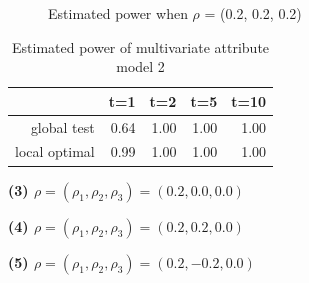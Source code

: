 \documentclass[12pt]{report}
\begin{document}
\begin{figure}[H]
\caption{Estimated power when $\rho$ = (0.2, 0.2, 0.2)}
\label{fig:multi2}    
\end{figure} 


\begin{table}[ht]
\centering
\begin{tabular}{rrrrr}
  \hline
 & t=1 & t=2 & t=5 & t=10 \\ 
  \hline
global test & 0.64 & 1.00 & 1.00 & 1.00 \\ 
  local optimal & 0.99 & 1.00 & 1.00 & 1.00 \\ 
   \hline
\end{tabular}
\caption{Estimated power of multivariate attribute model 2}
\end{table}

\textbf{(3) $\rho = (\rho_{1}, \rho_{2}, \rho_{3}) = (0.2, 0.0, 0.0)$}

\textbf{(4) $\rho = (\rho_{1}, \rho_{2}, \rho_{3}) = (0.2, 0.2, 0.0)$}

\newpage
\textbf{(5) $\rho = (\rho_{1}, \rho_{2}, \rho_{3}) = (0.2, -0.2, 0.0)$}
\end{document}
